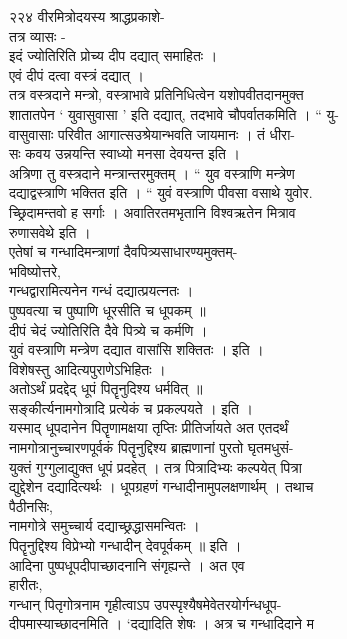 \documentclass[11pt, openany]{book}
\begin{document}
{{{{{{{{{{{{{{{{{{{{{{{{{{{{{{{{{{{{{{{{{{{{{{{{{{{{{{{{{{{{{{{{{{{{{{{{{{{{{{{{{{{{{{{{{{{{{{{{{{{{{{{{{{{{{{{{{{{{{{{{{{{{{{{{२२४ वीरमित्रोदयस्य श्राद्धप्रकाशे-}{\\
तत्र व्यासः -\\
इदं ज्योतिरिति प्रोच्य दीप दद्यात् समाहितः ।\\
एवं दीपं दत्वा वस्त्रं दद्यात् ।\\
तत्र वस्त्रदाने मन्त्रो, वस्त्राभावे प्रतिनिधित्वेन यशोपवीतदानमुक्त\\
शातातपेन ` युवासुवासा ' इति दद्यात्, तदभावे चौपर्वातकमिति । `` यु-\\
वासुवासाः परिवीत आगात्सउश्रेयान्भवति जायमानः । तं धीरा-\\
सः कवय उन्नयन्ति स्वाध्यो मनसा देवयन्त इति ।\\
अत्रिणा तु वस्त्रदाने मन्त्रान्तरमुक्तम् । `` युव वस्त्राणि मन्त्रेण\\
दद्याद्वस्त्राणि भक्तित इति । `` युवं वस्त्राणि पीवसा वसाथे युवोर.\\
च्छ्रिदामन्तवो ह सर्गाः । अवातिरतमभृतानि विश्वऋतेन मित्राव\\
रुणासवेथे इति ।\\
एतेषां च गन्धादिमन्त्राणां दैवपित्र्यसाधारण्यमुक्तम्-\\
भविष्योत्तरे,\\
गन्धद्वारामित्यनेन गन्धं दद्यात्प्रयत्नतः ।\\
पुष्पवत्या च पुष्पाणि धूरसीति च धूपकम् ॥\\
दीपं चेदं ज्योतिरिति दैवे पित्र्ये च कर्मणि ।\\
युवं वस्त्राणि मन्त्रेण दद्यात वासांसि शक्तितः । इति ।\\
विशेषस्तु आदित्यपुराणेऽभिहितः ।\\
अतोऽर्थं प्रदद्देद् धूपं पितॄनुदिश्य धर्मवित् ॥\\
सङ्कीर्त्यनामगोत्रादि प्रत्येकं च प्रकल्पयते । इति ।\\
यस्माद् धूपदानेन पि}{तॄ}{णामक्षया तृप्तिः प्रीतिर्जायते अत एतदर्थं\\
नामगोत्रानुच्चारणपूर्वकं पितॄनुद्दिश्य ब्राह्मणानां पुरतो घृतमधुसं-\\
युक्तं गुग्गुलाद्युक्त धूपं प्रदहेत् । तत्र पित्रादिभ्यः कल्पयेत्
पित्रा\\
द्युद्देशेन दद्यादित्यर्थः । धूपग्रहणं गन्धादीनामुपलक्षणार्थम् । तथाच\\
पैठीनसिः,\\
नामगोत्रे समुच्चार्य दद्याच्छ्रद्धासमन्वितः ।\\
पितॄनुद्दिश्य विप्रेभ्यो गन्धादीन् देवपूर्वकम् ॥ इति ।\\
आदिना पुष्पधूपदीपाच्छादनानि संगृह्यन्ते । अत एव\\
हारीतः,\\
गन्धान् पितृगोत्रनाम गृहीत्वाऽप उपस्पृश्यैषमेवेतरयोर्गन्धधूप-\\
दीपमास्याच्छादनमिति । `दद्यादिति शेषः । अत्र च गन्धादिदाने म\\


}}}}}}}}}}}}}}}}}}}}}}}}}}}}}}}}}}}}}}}}}}}}}}}}}}}}}}}}}}}}}}}}}}}}}}}}}}}}}}}}}}}}}}}}}}}}}}}}}}}}}}}}}}}}}}}}}}}}}}}}}}}}}}}}
\end{document}
